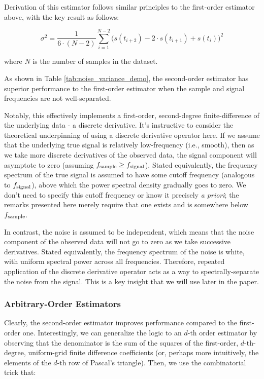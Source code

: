 \documentclass[conf]{new-aiaa}
\begin{document}
    Derivation of this estimator follows similar principles to the first-order estimator above, with the key result as follows:

    \begin{equation}
        \sigma^2 = \frac{1}{6 \cdot (N-2)} \sum_{i=1}^{N-2} \Big( s(t_{i+2}) - 2 \cdot s(t_{i+1}) + s(t_i) \Big)^2
        \label{eq:2nd_order_noise_estimator}
    \end{equation}

    \noindent where $N$ is the number of samples in the dataset.

    As shown in Table \ref{tab:noise_variance_demo}, the second-order estimator has superior performance to the first-order estimator when the sample and signal frequencies are not well-separated.

    Notably, this effectively implements a first-order, second-degree finite-difference of the underlying data - a discrete derivative. It's instructive to consider the theoretical underpinning of using a discrete derivative operator here. If we assume that the underlying true signal is relatively low-frequency (i.e., smooth), then as we take more discrete derivatives of the observed data, the signal component will asymptote to zero (assuming $f_{\rm sample} \geq f_{\rm signal}$). Stated equivalently, the frequency spectrum of the true signal is assumed to have some cutoff frequency (analogous to $f_{\rm signal}$), above which the power spectral density gradually goes to zero. We don't need to specify this cutoff frequency or know it precisely \emph{a priori}; the remarks presented here merely require that one exists and is somewhere below $f_{\rm sample}$.

    In contrast, the noise is assumed to be independent, which means that the noise component of the observed data will not go to zero as we take successive derivatives. Stated equivalently, the frequency spectrum of the noise is white, with uniform spectral power across all frequencies. Therefore, repeated application of the discrete derivative operator acts as a way to spectrally-separate the noise from the signal. This is a key insight that we will use later in the paper.

    \subsubsection{Arbitrary-Order Estimators}

    Clearly, the second-order estimator improves performance compared to the first-order one. Interestingly, we can generalize the logic to an $d$-th order estimator by observing that the denominator is the sum of the squares of the first-order, $d$-th-degree, uniform-grid finite difference coefficients (or, perhaps more intuitively, the elements of the $d$-th row of Pascal's triangle). Then, we use the combinatorial trick that:
\end{document}
